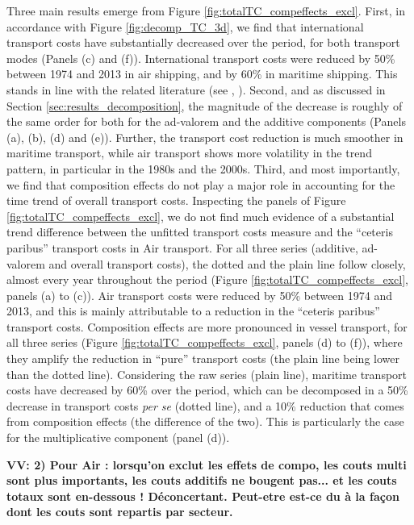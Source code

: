 \documentclass[a4paper,11pt]{article}
\begin{document}
Three main results emerge from Figure \ref{fig:totalTC_compeffects_excl}. First, in accordance with Figure \ref{fig:decomp_TC_3d}, we find that international transport costs have substantially decreased over the period, for both transport modes (Panels (c) and (f)). International transport costs were reduced by 50\% between 1974 and 2013 in air shipping, and by 60\% in maritime shipping. This stands in line with the related literature (see \citealp{Hummels_1999}, \citealp{Lafourcade_Thisse}). Second, and as discussed in Section \ref{sec:results_decomposition}, the magnitude of the decrease is roughly of the same order for both for the ad-valorem and the additive components (Panels (a), (b), (d) and (e)). Further, the transport cost reduction is much smoother in maritime transport, while air transport shows more volatility in the trend pattern, in particular in the 1980s and the 2000s. Third, and most importantly, we find that composition effects do not play a major role in accounting for the time trend of overall transport costs. Inspecting the panels of Figure \ref{fig:totalTC_compeffects_excl}, we do not find much evidence of a substantial trend difference between the unfitted transport costs measure and the ``ceteris paribus'' transport costs in Air transport. For all three series (additive, ad-valorem and overall transport costs), the dotted and the plain line follow closely, almost every year throughout the period (Figure \ref{fig:totalTC_compeffects_excl}, panels (a) to (c)). Air transport costs were reduced by 50\% between 1974 and 2013, and this is mainly attributable to a reduction in the ``ceteris paribus'' transport costs. Composition effects are more pronounced in vessel transport, for all three series (Figure \ref{fig:totalTC_compeffects_excl}, panels (d) to (f)), where they amplify the reduction in ``pure'' transport costs (the plain line being lower than the dotted line). Considering the raw series (plain line), maritime transport costs have decreased by 60\% over the period, which can be decomposed in a 50\% decrease in transport costs \textit{per se} (dotted line), and a 10\% reduction that comes from composition effects (the difference of the two). This is particularly the case for the multiplicative component (panel (d)).\smallskip



\textbf{VV: 2) Pour Air : lorsqu’on exclut les effets de compo, les couts multi sont plus importants, les couts additifs ne bougent pas... et les couts totaux sont en-dessous ! Déconcertant. Peut-etre est-ce du à la façon dont les couts sont repartis par secteur.}
\end{document}
